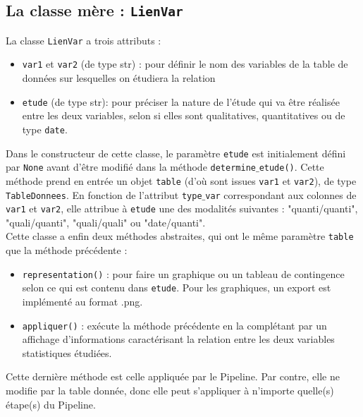 \documentclass[11pt]{article}
\begin{document}
\subsection*{La classe mère : \texttt{LienVar}}
La classe \texttt{LienVar} a trois attributs :
\begin{itemize}
    \item \texttt{var1} et \texttt{var2} (de type str) : pour définir le nom des variables de la table de données sur lesquelles on étudiera la relation
    \item \texttt{etude} (de type str): pour préciser la nature de l'étude qui va être réalisée entre les deux variables, selon si elles sont qualitatives, quantitatives ou de type \texttt{date}.
\end{itemize}
Dans le constructeur de cette classe, le paramètre \texttt{etude} est initialement défini par \texttt{None} avant d'être modifié dans la méthode \texttt{determine$\_$etude()}. Cette méthode prend en entrée un objet \texttt{table} (d'où sont issues \texttt{var1} et \texttt{var2}), de type \texttt{TableDonnees}. En fonction de l'attribut \texttt{type$\_$var} correspondant aux colonnes de \texttt{var1} et \texttt{var2}, elle attribue à \texttt{etude} une des modalités suivantes : "quanti/quanti", "quali/quanti", "quali/quali" ou "date/quanti".\\
Cette classe a enfin deux méthodes abstraites, qui ont le même paramètre \texttt{table} que la méthode précédente :
\begin{itemize}
    \item \texttt{representation()} : pour faire un graphique ou un tableau de contingence selon ce qui est contenu dans \texttt{etude}. Pour les graphiques, un export est implémenté au format .png.
    \item \texttt{appliquer()} : exécute la méthode précédente en la complétant par un affichage d'informations caractérisant la relation entre les deux variables statistiques étudiées.
\end{itemize}
Cette dernière méthode est celle appliquée par le Pipeline. Par contre, elle ne modifie par la table donnée, donc elle peut s'appliquer à n'importe quelle(s) étape(s) du Pipeline. 
\end{document}
